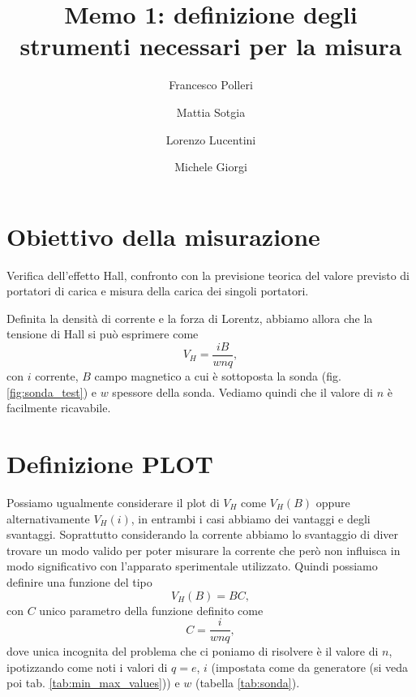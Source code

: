 \documentclass[fleqn,varvw,preprintnumbers]{memo}
\begin{document}
\title{Memo 1: definizione degli strumenti necessari per la misura}

\author{Francesco Polleri}
\author{Mattia Sotgia}


\author{Lorenzo Lucentini}
\author{Michele Giorgi}

\revised{\today}

\begin{abstract}

\end{abstract}
\maketitle

\section{Obiettivo della misurazione}

Verifica dell'effetto Hall, confronto con la previsione teorica del valore previsto di portatori di carica e misura della carica dei singoli portatori.

Definita la densità di corrente e la forza di Lorentz, abbiamo allora che la tensione di Hall si può esprimere come \begin{equation}
    V_H = \frac{iB}{wnq},\label{eq:V_H_full}
\end{equation} con $i$ corrente, $B$ campo magnetico a cui è sottoposta la sonda (fig. \ref{fig:sonda_test}) e $w$ spessore della sonda. Vediamo quindi che il valore di $n$ è facilmente ricavabile. 



\section{Definizione PLOT}

Possiamo ugualmente considerare il plot di $V_H$ come $V_H(B)$ oppure alternativamente $V_H(i)$, in entrambi i casi abbiamo dei vantaggi e degli svantaggi. Soprattutto considerando la corrente abbiamo lo svantaggio di diver trovare un modo valido per poter misurare la corrente che però non influisca in modo significativo con l'apparato sperimentale utilizzato. 
Quindi possiamo definire una funzione del tipo \begin{equation}
    V_H(B) = BC,
\end{equation} con $C$ unico parametro della funzione definito come \begin{equation}
    C=\frac{i}{wnq},
\end{equation} dove unica incognita del problema che ci poniamo di risolvere è il valore di $n$, ipotizzando come noti i valori di $q=e$, $i$ (impostata come da generatore (si veda poi tab. \ref{tab:min_max_values})) e $w$ (tabella \ref{tab:sonda}).
\end{document}
